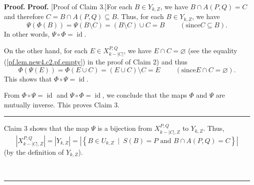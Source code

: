 \documentclass[numbers=enddot,12pt,final,onecolumn,notitlepage]{scrartcl}%
\theoremstyle{definition}
\newenvironment{proof}[1][Proof]{\noindent\textbf{#1.} }{\ \rule{0.5em}{0.5em}}
\theoremstyle{plainsl}
\begin{document}
\begin{proof}
\begin{proof}
[Proof of Claim 3.]For each $B\in Y_{k,Z}$, we have $B\cap A\left(
P,Q\right)  =C$ and therefore $C=B\cap A\left(  P,Q\right)  \subseteq B$.
Thus, for each $B\in Y_{k,Z}$, we have%
\[
\Psi\left(  \Phi\left(  B\right)  \right)  =\Psi\left(  B\setminus C\right)
=\left(  B\setminus C\right)  \cup C=B\ \ \ \ \ \ \ \ \ \ \left(  \text{since
}C\subseteq B\right)  .
\]
In other words, $\Psi\circ\Phi=\operatorname*{id}$.

On the other hand, for each $E\in X_{k-\left\vert C\right\vert }^{P,Q}$, we
have $E\cap C=\varnothing$ (see the equality (\ref{pf.lem.new4.c2.pf.empty})
in the proof of Claim 2) and thus%
\[
\Phi\left(  \Psi\left(  E\right)  \right)  =\Phi\left(  E\cup C\right)
=\left(  E\cup C\right)  \setminus C=E\ \ \ \ \ \ \ \ \ \ \left(  \text{since
}E\cap C=\varnothing\right)  .
\]
This shows that $\Phi\circ\Psi=\operatorname*{id}$.

From $\Phi\circ\Psi=\operatorname*{id}$ and $\Psi\circ\Phi=\operatorname*{id}%
$, we conclude that the maps $\Phi$ and $\Psi$ are mutually inverse. This
proves Claim 3.
\end{proof}

Claim 3 shows that the map $\Psi$ is a bijection from $X_{k-\left\vert
C\right\vert ,Z}^{P,Q}$ to $Y_{k,Z}$. Thus,%
\[
\left\vert X_{k-\left\vert C\right\vert ,Z}^{P,Q}\right\vert =\left\vert
Y_{k,Z}\right\vert =\left\vert \left\{  B\in U_{k,Z}\ \mid\ S\left(  B\right)
=P\text{ and }B\cap A\left(  P,Q\right)  =C\right\}  \right\vert
\]
(by the definition of $Y_{k,Z}$).


\end{proof}
\end{document}
